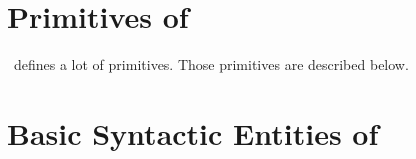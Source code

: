 \documentclass{extex-doc}
\begin{document}
\section{Primitives of \ExTeX}
\ExTeX\ defines a lot of primitives. Those primitives are described below.

\section{Basic Syntactic Entities of \ExTeX}




\appendix



{\scriptsize\printindex}
\end{document}

